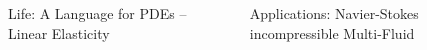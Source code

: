 \documentclass[final,utf8,,hyperref={pdfpagelabels=false}]{beamer}
\newcommand{\goodgap}{%
  \hspace{\subfigtopskip}%
  \hspace{\subfigbottomskip}}
\begin{document}
\begin{frame}[containsverbatim]{}
\begin{columns}[t]
\begin{block}{Life: A Language for PDEs -- Linear Elasticity}
  \end{block}


  \begin{block}{Applications: Navier-Stokes incompressible Multi-Fluid}
    
    \begin{columns}[t]
      \begin{column}{.45\textwidth}
        \begin{figure}
      \centering
      \goodgap
      \\
      \goodgap
      \\

\end{figure}
\end{column}
\end{columns}
\end{block}
\end{columns}
\end{frame}
\end{document}
